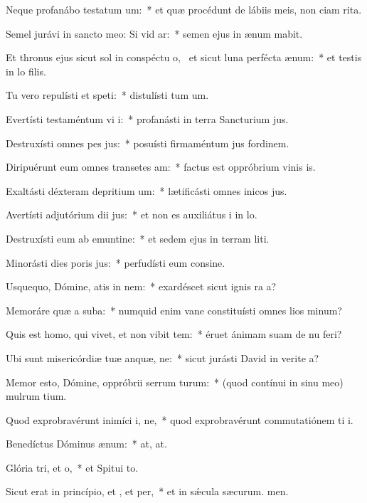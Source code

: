 \item Neque profanábo testatum um:~* et quæ procédunt de lábiis meis, non ciam rita.
\item Semel jurávi in sancto meo: Si vid ar:~* semen ejus in ænum mabit.
\item Et thronus ejus sicut sol in conspéctu o,~\pscross{} et sicut luna perfécta  ænum:~* et testis in lo filis.
\item Tu vero repulísti et speti:~* distulísti tum um.
\item Evertísti testaméntum vi i:~* profanásti in terra Sancturium jus.
\item Destruxísti omnes pes jus:~* posuísti firmaméntum jus fordinem.
\item Diripuérunt eum omnes transetes am:~* factus est oppróbrium vinis is.
\item Exaltásti déxteram depritium um:~* lætificásti omnes inicos jus.
\item Avertísti adjutórium dii jus:~* et non es auxiliátus i in lo.
\item Destruxísti eum ab emuntine:~* et sedem ejus in terram liti.
\item Minorásti dies poris jus:~* perfudísti eum consine.
\item Usquequo, Dómine, atis in nem:~* exardéscet sicut ignis ra a?
\item Memoráre quæ a suba:~* numquid enim vane constituísti omnes lios minum?
\item Quis est homo, qui vivet, et non vibit tem:~* éruet ánimam suam de nu feri?
\item Ubi sunt misericórdiæ tuæ anquæ, ne:~* sicut jurásti David in verite a?
\item Memor esto, Dómine, oppróbrii serrum turum:~* (quod contínui in sinu meo) mulrum tium.
\item Quod exprobravérunt inimíci i, ne,~* quod exprobravérunt commutatiónem ti i.
\item Benedíctus Dóminus  ænum:~* at, at.
\item Glória tri, et o,~* et Spitui to.
\item Sicut erat in princípio, et , et per,~* et in sǽcula sæcurum. men.
